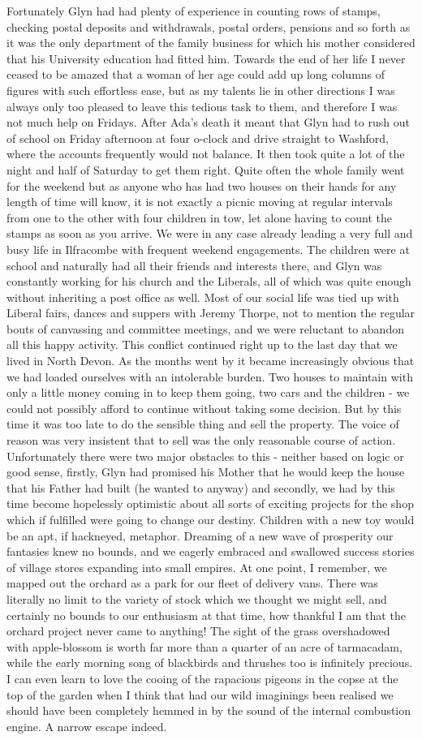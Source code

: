 Fortunately Glyn had had plenty of experience in counting rows of stamps, checking postal deposits and withdrawals, postal orders, pensions and so forth as it was the only department of the family business for which his mother considered that his University education had fitted him. Towards the end of her life I never ceased to be amazed that a woman of her age could add up long columns of figures with such effortless ease, but as my talents lie in other directions I was always only too pleased to leave this tedious task to them, and therefore I was not much help on Fridays. After Ada's death it meant that Glyn had to rush out of school on Friday afternoon at four o-clock and drive straight to Washford, where the accounts frequently would not balance. It then took quite a lot of the night and half of Saturday to get them right. Quite often the whole family went for the weekend but as anyone who has had two houses on their hands for any length of time will know, it is not exactly a picnic moving at regular intervals from one to the other with four children in tow, let alone having to count the stamps as soon as you arrive. We were in any case already leading a very full and busy life in Ilfracombe with frequent weekend engagements. The children were at school and naturally had all their friends and interests there, and Glyn was constantly working for his church and the Liberals, all of which was quite enough without inheriting a post office as well. Most of our social life was tied up with Liberal fairs, dances and suppers with Jeremy Thorpe, not to mention the regular bouts of canvassing and committee meetings, and we were reluctant to abandon all this happy activity. This conflict continued right up to the last day that we lived in North Devon. As the months went by it became increasingly obvious that we had loaded ourselves with an intolerable burden. Two houses to maintain with only a little money coming in to keep them going, two cars and the children - we could not possibly afford to continue without taking some decision. But by this time it was too late to do the sensible thing and sell the property. The voice of reason was very insistent that to sell was the only reasonable course of action. Unfortunately there were two major obstacles to this - neither based on logic or good sense, firstly, Glyn had promised his Mother that he would keep the house that his Father had built (he wanted to anyway) and secondly, we had by this time become hopelessly optimistic about all sorts of exciting projects for the shop which if fulfilled were going to change our destiny. Children with a new toy would be an apt, if hackneyed, metaphor. Dreaming of a new wave of prosperity our fantasies knew no bounds, and we eagerly embraced and swallowed success stories of village stores expanding into small empires. At one point, I remember, we mapped out the orchard as a park for our fleet of delivery vans. There was literally no limit to the variety of stock which we thought we might sell, and certainly no bounds to our enthusiasm at that time, how thankful I am that the orchard project never came to anything! The sight of the grass overshadowed with apple-blossom is worth far more than a quarter of an acre of tarmacadam, while the early morning song of blackbirds and thrushes too is infinitely precious. I can even learn to love the cooing of the rapacious pigeons in the copse at the top of the garden when I think that had our wild imaginings been realised we should have been completely hemmed in by the sound of the internal combustion engine. A narrow escape indeed.